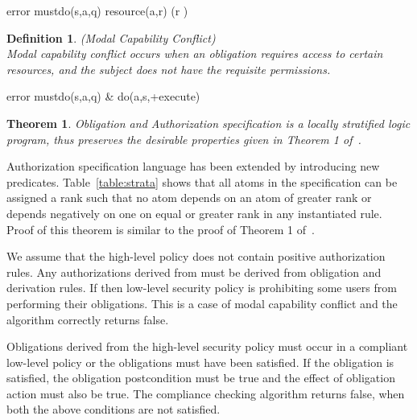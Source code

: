 \documentclass[12pt,journal,letterpaper,onecolumn]{IEEEtran}
\newtheorem{theorem}{Theorem}[section]
\newtheorem{definition}{Definition}[section]
\newenvironment{myproofsketch}
{\noindent {\bf Proof Sketch:}}{\hspace*{\fill}}
\begin{document}
{\ttfamily error  mustdo(s,a,q)  resource(a,r) 
(r )}

\begin{definition}(Modal Capability Conflict)\\
Modal capability conflict occurs when an obligation requires access
to certain resources, and the subject does not have the requisite
permissions.
\end{definition}

{\ttfamily error  mustdo(s,a,q) \&
do(a,s,+execute)}

\begin{theorem}
Obligation and Authorization specification is a locally stratified
logic program, thus preserves the desirable properties given in
Theorem 1 of~\cite{Jajodia01}.
\end{theorem}
\begin{myproofsketch} Authorization specification language has been
extended by introducing new predicates. Table~\ref{table:strata}
shows that all atoms in the specification can be assigned a rank
such that no atom depends on an atom of greater rank or depends
negatively on one on equal or greater rank in any instantiated rule.
Proof of this theorem is similar to the proof of Theorem 1
of~\cite{Jajodia01}.
\end{myproofsketch}


We assume that the high-level policy does not contain positive
authorization rules. Any authorizations derived from  must be
derived from obligation and derivation rules. If    then low-level security policy is prohibiting some
users from performing their obligations. This is a case of modal
capability conflict and the algorithm correctly returns false.

Obligations derived from the high-level security policy must occur
in a compliant low-level policy or the obligations must have been
satisfied. If the obligation is satisfied, the obligation
postcondition must be true and the effect of obligation action must
also be true. The compliance checking algorithm returns false, when
both the above conditions are not satisfied.
\end{document}
